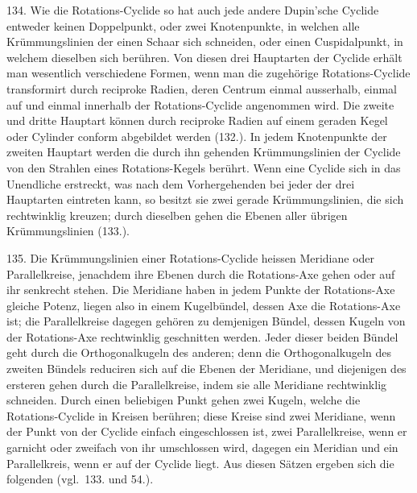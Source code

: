 134. Wie die Rotations-Cyclide so hat auch jede andere
Dupin'sche Cyclide entweder keinen Doppelpunkt, oder zwei
{\glqq}Knotenpunkte{\grqq}, in welchen alle Kr\"ummungslinien der einen
Schaar sich schneiden, oder einen {\glqq}Cuspidalpunkt{\grqq}, in welchem
dieselben sich ber\"uhren. Von diesen drei Hauptarten der
Cyclide erh\"alt man wesentlich verschiedene Formen, wenn
man die zugeh\"orige Rotations-Cyclide transformirt durch reciproke
Radien, deren Centrum einmal ausserhalb, einmal
auf und einmal innerhalb der Rotations-Cyclide angenommen
wird. Die zweite und dritte Hauptart k\"onnen durch reciproke
Radien auf einem geraden Kegel oder Cylinder conform abgebildet
werden (132.). In jedem Knotenpunkte der zweiten
Hauptart werden die durch ihn gehenden Kr\"ummungslinien
der Cyclide von den Strahlen eines Rotations-Kegels ber\"uhrt.
Wenn eine Cyclide sich in das Unendliche erstreckt, was
nach dem Vorhergehenden bei jeder der drei Hauptarten eintreten
kann, so besitzt sie zwei gerade Kr\"ummungslinien, die
sich rechtwinklig kreuzen; durch dieselben gehen die Ebenen
aller \"ubrigen Kr\"ummungslinien (133.).

135. Die Kr\"ummungslinien einer Rotations-Cyclide heissen
Meridiane oder Parallelkreise, jenachdem ihre Ebenen durch
die Rotations-Axe gehen oder auf ihr senkrecht stehen. Die
Meridiane haben in jedem Punkte der Rotations-Axe gleiche
Potenz, liegen also in einem Kugelb\"undel, dessen Axe die
Rotations-Axe ist; die Parallelkreise dagegen geh\"oren zu
demjenigen B\"undel, dessen Kugeln von der Rotations-Axe
rechtwinklig geschnitten werden. Jeder dieser beiden B\"undel
geht durch die Orthogonalkugeln des anderen; denn die Orthogonalkugeln
des zweiten B\"undels reduciren sich auf die Ebenen
der Meridiane, und diejenigen des ersteren gehen durch die
Parallelkreise, indem sie alle Meridiane rechtwinklig schneiden.
Durch einen beliebigen Punkt gehen zwei Kugeln,
welche die Rotations-Cyclide in Kreisen ber\"uhren; diese Kreise
sind zwei Meridiane, wenn der Punkt von der Cyclide einfach
eingeschlossen ist, zwei Parallelkreise, wenn er garnicht oder
zweifach von ihr umschlossen wird, dagegen ein Meridian
und ein Parallelkreis, wenn er auf der Cyclide liegt. Aus
diesen S\"atzen ergeben sich die folgenden (vgl.\ 133. und 54.).

